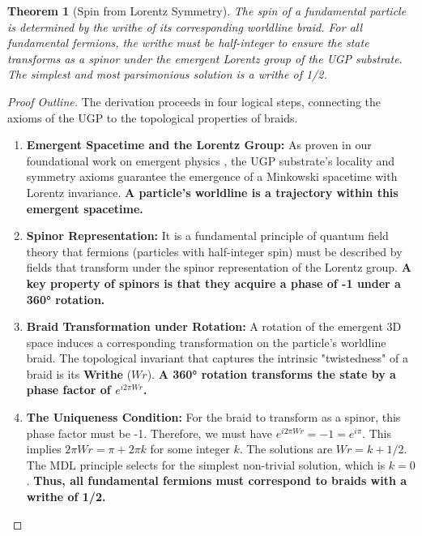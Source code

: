 \documentclass[11pt]{article}
\newtheorem{theorem}{Theorem}[section]
\theoremstyle{remark}
\begin{document}
\begin{theorem}[Spin from Lorentz Symmetry]
\label{thm:spin}
The spin of a fundamental particle is determined by the writhe of its corresponding worldline braid. For all fundamental fermions, the writhe must be half-integer to ensure the state transforms as a spinor under the emergent Lorentz group of the UGP substrate. The simplest and most parsimonious solution is a writhe of 1/2.
\end{theorem}
\begin{proof}[Proof Outline]
The derivation proceeds in four logical steps, connecting the axioms of the UGP to the topological properties of braids.
\begin{enumerate}[leftmargin=*,itemsep=2pt]
    \item \textbf{Emergent Spacetime and the Lorentz Group:} As proven in our foundational work on emergent physics \cite{spivack2025emergence_gravity_qm}, the UGP substrate's locality and symmetry axioms guarantee the emergence of a Minkowski spacetime with Lorentz invariance. \textbf{A particle's worldline is a trajectory within this emergent spacetime.}
    \item \textbf{Spinor Representation:} It is a fundamental principle of quantum field theory that fermions (particles with half-integer spin) must be described by fields that transform under the spinor representation of the Lorentz group. \textbf{A key property of spinors is that they acquire a phase of -1 under a 360° rotation.}
    \item \textbf{Braid Transformation under Rotation:} A rotation of the emergent 3D space induces a corresponding transformation on the particle's worldline braid. The topological invariant that captures the intrinsic "twistedness" of a braid is its \textbf{Writhe} ($Wr$). \textbf{A 360° rotation transforms the state by a phase factor of $e^{i 2\pi Wr}$.}
    \item \textbf{The Uniqueness Condition:} For the braid to transform as a spinor, this phase factor must be -1. Therefore, we must have $e^{i 2\pi Wr} = -1 = e^{i\pi}$. This implies $2\pi Wr = \pi + 2\pi k$ for some integer $k$. The solutions are $Wr = k + 1/2$. The MDL principle selects for the simplest non-trivial solution, which is $k=0$. \textbf{Thus, all fundamental fermions must correspond to braids with a writhe of 1/2.}
\end{enumerate}
\end{proof}
\end{document}
